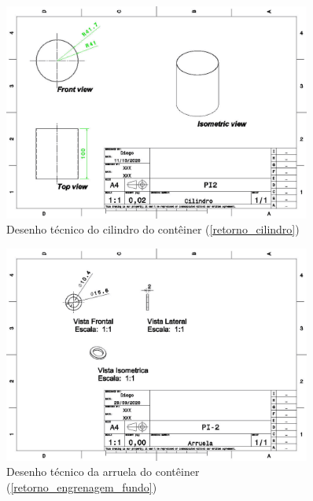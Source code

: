 \begin{apendicesenv}
\begin{figure}[H]
    \centering
    \includegraphics[width=0.9\textwidth]{figuras/estrutura/Desenhos/Drawing1_Cilindro.jpg}
    \caption{Desenho técnico do cilindro do contêiner (\ref{retorno_cilindro})}
    \label{fig:cilindro}
\end{figure}

\begin{figure}[H]
    \centering
    \includegraphics[width=0.9\textwidth]{figuras/estrutura/Desenhos/Drawing1_Arruela.jpg}
    \caption{Desenho técnico da arruela do contêiner (\ref{retorno_engrenagem_fundo})}
    \label{fig:arruela}
\end{figure}


\end{apendicesenv}
